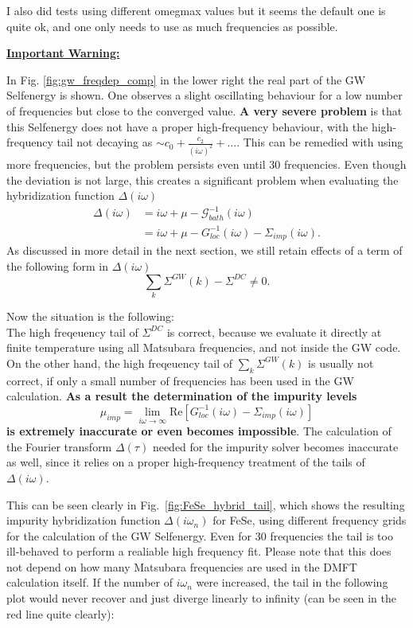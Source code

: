 \documentclass[12pt,a4paper]{scrartcl}
\numberwithin{equation}{section}
\begin{document}
I also did tests using different omegmax values but it seems the default
one is quite ok, and one only needs to use as much frequencies as possible.

\bigskip

\underline{\textbf{Important Warning:}}

In Fig. \ref{fig:gw_freqdep_comp} in the lower right the
real part of the GW Selfenergy is shown. One observes a slight oscillating behaviour 
for a low number of frequencies but close to the converged value.
\textbf{A very severe problem} is that this Selfenergy does not have a
proper high-frequency behaviour, with the high-frequency tail not decaying 
as $\sim c_0 + \frac{c_2}{(i\omega)^2} + ...$.
This can be remedied with using more frequencies, but the problem persists 
even until 30 frequencies.
Even though the deviation is not large, this creates a significant problem
when evaluating the hybridization function $\Delta(i\omega)$
\begin{align}
\Delta(i\omega) &= i\omega + \mu - \mathscr{G}_{bath}^{-1}(i\omega) \\
&= i\omega + \mu - G_{loc}^{-1}(i\omega) - \Sigma_{imp}(i\omega).
\end{align}
As discussed in more detail in the next section, 
we still retain effects of a term of the following form in $\Delta(i\omega)$
\[
\sum_k \Sigma^{GW}(k) - \Sigma^{DC} \neq 0.
\]

Now the situation is the following:\\
The high freqeuency tail of $\Sigma^{DC}$ is correct, because we evaluate
it directly at finite temperature using all Matsubara frequencies,
and not inside the GW code. 
On the other hand, the high freqeuency tail of $\sum_k \Sigma^{GW}(k)$
is usually not correct, if only a small number of frequencies
has been used in the GW calculation.
\textbf{As a result the determination of the impurity levels}
\[
\mu_{imp} = \lim_{i\omega \rightarrow \infty} 
\mathrm{Re}\left[G_{loc}^{-1}(i\omega) - \Sigma_{imp}(i\omega) \right]
\]
\textbf{is extremely inaccurate or even becomes impossible}.
The calculation of the Fourier transform $\Delta(\tau)$ needed for the impurity
solver becomes inaccurate as well, since it relies on a proper high-frequency
treatment of the tails of $\Delta(i\omega)$.

This can be seen clearly in Fig.~\ref{fig:FeSe_hybrid_tail}, which shows the resulting
impurity hybridization function $\Delta(i\omega_n)$ for FeSe, using different
frequency grids for the calculation of the GW Selfenergy. 
Even for 30 frequencies the tail is too ill-behaved to perform a realiable
high frequency fit. Please note that this does not depend on how many Matsubara frequencies
are used in the DMFT calculation itself. If the number of $i\omega_n$ were increased,
the tail in the following plot would never recover and just diverge linearly to infinity
(can be seen in the red line quite clearly):
\end{document}
